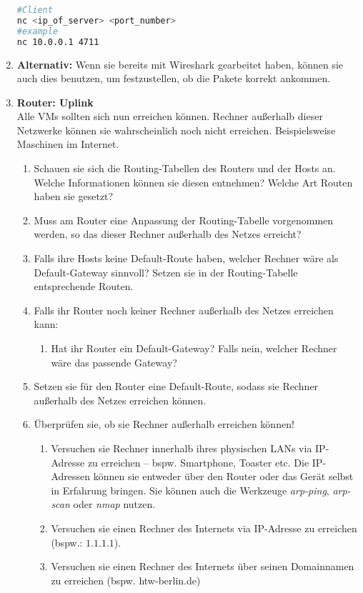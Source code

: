\documentclass[paper=a4,fontsize=11pt]{scrartcl}%
\begin{document}
\begin{enumerate}
		\begin{lstlisting}[style=Bash, language=Bash, label={netcat_client}]
#Client 
nc <ip_of_server> <port_number>
#example
nc 10.0.0.1 4711
		\end{lstlisting}
		\item \textbf{Alternativ:} Wenn sie bereits mit Wireshark gearbeitet haben, können sie auch dies benutzen, um festzustellen, ob die Pakete korrekt ankommen. 
	\item \textbf{Router: Uplink}\\
	Alle VMs sollten sich nun erreichen können. Rechner außerhalb dieser Netzwerke können sie wahrscheinlich noch nicht erreichen. Beispielsweise Maschinen im Internet.
	\begin{enumerate}
		\item Schauen sie sich die Routing-Tabellen des Routers und der Hosts an. Welche Informationen können sie diesen entnehmen? Welche Art Routen haben sie gesetzt?
        \item Muss am Router eine Anpassung der Routing-Tabelle vorgenommen werden, so das dieser Rechner außerhalb des Netzes erreicht?
        \item Falls ihre Hosts keine Default-Route haben, welcher Rechner wäre als Default-Gateway sinnvoll? Setzen sie in der Routing-Tabelle entsprechende Routen.
        \item Falls ihr Router noch keiner Rechner außerhalb des Netzes erreichen kann:
        \begin{enumerate}
        		\item Hat ihr Router ein Default-Gateway? Falls nein, welcher Rechner wäre das passende Gateway?
        \end{enumerate}
        \item Setzen sie für den Router eine Default-Route, sodass sie Rechner außerhalb des Netzes erreichen können.
        \item Überprüfen sie, ob sie Rechner außerhalb erreichen können!
     	\begin{enumerate}
     		\item Versuchen sie Rechner innerhalb ihres physischen LANs via IP-Adresse zu erreichen -- bspw. Smartphone, Toaster etc. Die IP-Adressen können sie entweder über den Router oder das Gerät selbst in Erfahrung bringen. Sie können auch die Werkzeuge \emph{arp-ping}, \emph{arp-scan} oder \emph{nmap} nutzen.
     		\item Versuchen sie einen Rechner des Internets via IP-Adresse zu erreichen (bspw.: $1.1.1.1$).
     		\item Versuchen sie einen Rechner des Internets über seinen Domainnamen zu erreichen (bspw. htw-berlin.de)

\end{enumerate}
\end{enumerate}
\end{enumerate}
\end{document}
